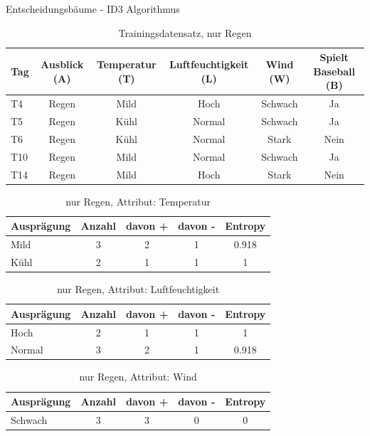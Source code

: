 \begin{task}[credit=16]{Entscheidungsbäume - ID3 Algorithmus}
\begin{subtask}[points=10,title=ID3 Algorithmus]
\begin{solution}
\begin{table}[H]
	\centering
	\caption{Trainingsdatensatz, nur Regen}
	\begin{tabular}{l|c|c|c|c|c}
		\toprule
		\textbf{Tag} & \textbf{Ausblick (A)} & \textbf{Temperatur (T)}  & \textbf{Luftfeuchtigkeit (L)} & \textbf{Wind (W)}     & \textbf{Spielt Baseball (B)} \\
		\midrule
		T4  & Regen     & Mild        & Hoch             & Schwach  & Ja              \\
		T5  & Regen     & Kühl        & Normal           & Schwach  & Ja              \\
		T6  & Regen     & Kühl        & Normal           & Stark    & Nein            \\
		T10 & Regen     & Mild        & Normal           & Schwach  & Ja              \\
		T14 & Regen     & Mild        & Hoch             & Stark    & Nein            \\
		\bottomrule
	\end{tabular}
\end{table}
\begin{table}[H]
	\centering
	\caption{nur Regen, Attribut: Temperatur}
	\begin{tabular}{l|c|c|c|c}
		\toprule
		\textbf{Ausprägung} & \textbf{Anzahl} & \textbf{davon +}  & \textbf{davon -} &\textbf{Entropy} \\
		\midrule
		Mild & 3&2&1&0.918   \\
		Kühl & 2&1&1&1    \\
		\bottomrule
	\end{tabular}
\end{table}
\begin{table}[H]
	\centering
	\caption{nur Regen, Attribut: Luftfeuchtigkeit}
	\begin{tabular}{l|c|c|c|c}
		\toprule
		\textbf{Ausprägung} & \textbf{Anzahl} & \textbf{davon +}  & \textbf{davon -} &\textbf{Entropy} \\
		\midrule
		Hoch&2&1&1&1\\
		Normal&3&2&1&0.918\\
		\bottomrule
	\end{tabular}
\end{table}
\begin{table}[H]
	\centering
	\caption{nur Regen, Attribut: Wind}
	\begin{tabular}{l|c|c|c|c}
		\toprule
		\textbf{Ausprägung} & \textbf{Anzahl} & \textbf{davon +}  & \textbf{davon -} &\textbf{Entropy} \\
		\midrule
		Schwach&3&3&0&0\\

\end{tabular}
\end{table}
\end{solution}
\end{subtask}
\end{task}
